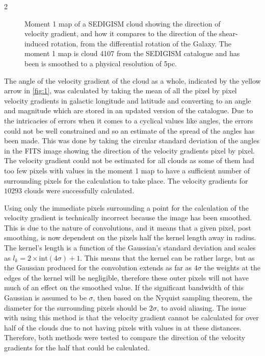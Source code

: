 \documentclass[a4paper,11pt]{article}
\begin{document}
\begin{multicols}{2}
\begin{figure}[H]
  \centering
  
  \caption{Moment 1 map of a SEDIGISM cloud showing the direction of velocity gradient, and how it compares to the direction of the shear-induced rotation, from the differential rotation of the Galaxy. The moment 1 map is cloud 4107 from the SEDIGISM catalogue and has been is smoothed to a physical resolution of 5pc.\label{fig:1}}
  \vspace{-0.7em}
\end{figure}

\par\noindent The angle of the velocity gradient of the cloud as a whole, indicated by the yellow arrow in \autoref{fig:1}, was calculated by taking the mean of all the pixel by pixel velocity gradients in galactic longitude and latitude and converting to an angle and magnitude which are stored in an updated version of the catalogue. Due to the intricacies of errors when it comes to a cyclical values like angles, the errors could not be well constrained and so an estimate of the spread of the angles has been made. This was done by taking the circular standard deviation of the angles in the FITS image showing the direction of the velocity gradients pixel by pixel. The velocity gradient could not be estimated for all clouds as some of them had too few pixels with values in the moment 1 map to have a sufficient number of surrounding pixels for the calculation to take place. The velocity gradients for $10 293$ clouds were successfully calculated.
\smallskip
\par\noindent Using only the immediate pixels surrounding a point for the calculation of the velocity gradient is technically incorrect because the image has been smoothed. This is due to the nature of convolutions, and it means that a given pixel, post smoothing, is now dependent on the pixels half the kernel length away in radius. The kernel's length is a function of the Gaussian's standard deviation and scales as $l_k = 2\times\text{int}(4\sigma) + 1$. This means that the kernel can be rather large, but as the Gaussian produced for the convolution extends as far as $4\sigma$ the weights at the edges of the kernel will be negligible, therefore these outer pixels will not have much of an effect on the smoothed value. If the significant bandwidth of this Gaussian is assumed to be $\sigma$, then based on the Nyquist sampling theorem, the diameter for the surrounding pixels should be $2\sigma$, to avoid aliasing. The issue with using this method is that the velocity gradient cannot be calculated for over half of the clouds due to not having pixels with values in at these distances. Therefore, both methods were tested to compare the direction of the velocity gradients for the half that could be calculated.


\end{multicols}
\end{document}
